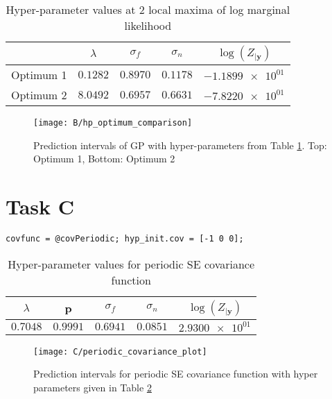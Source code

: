 \documentclass[11pt]{article}
\begin{document}
\begin{table}[h]
    \centering
    \begin{tabular}{|c|c|c|c|c|}
        \hline
         & $\lambda$ & $\sigma_f$ & $\sigma_n$ & $\log(Z_{|\textbf{y}})$ \\
        \hline
        Optimum 1 & $0.1282$ & $0.8970$ & $0.1178$ & $\num{-1.1899e+01}$ \\ 
        Optimum 2 & $8.0492$ & $0.6957$ & $0.6631$ & $\num{-7.8220e+01}$ \\ 
        \hline
    \end{tabular}
    \caption{Hyper-parameter values at 2 local maxima of log marginal likelihood}
    \label{table:B_hyper_parameter_optima}
\end{table}

\begin{figure}[h]
    \centering
    \texttt{[image: B/hp\_optimum\_comparison]}
    \caption{Prediction intervals of GP with hyper-parameters from Table \ref{table:B_hyper_parameter_optima}. Top: Optimum 1, Bottom: Optimum 2}
    \label{fig:B_hyper_parameter_optimum_comparison}
\end{figure}

\section{Task C}
\begin{lstlisting}[caption=Code to use periodic SE covariance. Training and prediction code same as Listing \ref{lst:A}, captionpos=b, basicstyle=\small]
covfunc = @covPeriodic; hyp_init.cov = [-1 0 0];
\end{lstlisting}
\label{lst:C}


\begin{table}[h]
    \centering
    \begin{tabular}{|c|c|c|c|c|}
        \hline
        $\lambda$ & p & $\sigma_f$ & $\sigma_n$ & $\log(Z_{|\textbf{y}})$ \\
        \hline
        $0.7048$ & $0.9991$ & $0.6941$ & $0.0851$ & $\num{2.9300e+01}$ \\ 
        \hline
    \end{tabular}
    \caption{Hyper-parameter values for periodic SE covariance function}
    \label{table:C_periodic_covariance_hyper_parameters}
\end{table}

\begin{figure}[h]
    \centering
    \texttt{[image: C/periodic\_covariance\_plot]}
    \caption{Prediction intervals for periodic SE covariance function with hyper parameters given in Table \ref{table:C_periodic_covariance_hyper_parameters}}
    \label{fig:B_periodic_covariance_prediction_intervals}
\end{figure}
\end{document}
